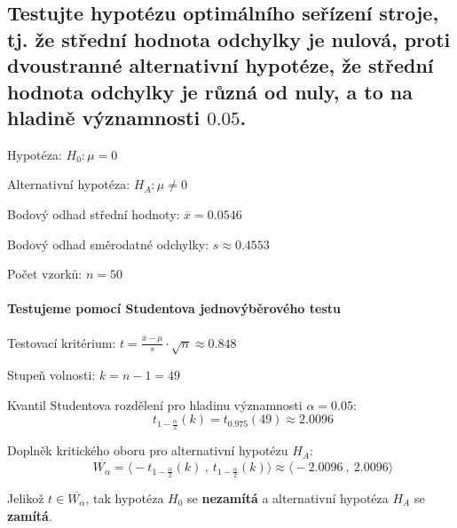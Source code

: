 
\subsection{Testujte hypotézu optimálního seřízení stroje, tj. že střední hodnota odchylky je nulová, proti dvoustranné alternativní hypotéze, že střední hodnota odchylky je různá od nuly, a to na hladině významnosti $0.05$.}

\begin{compactitem}
    \item Hypotéza: ${\displaystyle H_0 : \mu = 0}$

    \item Alternativní hypotéza: ${\displaystyle H_{A} : \mu \neq 0}$

    \item Bodový odhad střední hodnoty: ${\displaystyle \overline{x} = 0.0546}$

    \item Bodový odhad směrodatné odchylky: ${\displaystyle s \approx 0.4553}$

    \item Počet vzorků: ${\displaystyle n = 50}$
\end{compactitem}

\paragraph*{Testujeme pomocí Studentova jednovýběrového testu}

\begin{compactitem}
    \item Testovací kritérium: ${\displaystyle t = \frac{\overline{x} - \mu}{s} \cdot \sqrt{n} \approx 0.848}$

    \item Stupeň volnosti: ${\displaystyle k = n - 1 = 49}$

    \item Kvantil Studentova rozdělení pro hladinu významnosti ${\displaystyle \alpha = 0.05}$:
    $${\displaystyle \qquad t_{1 - \frac{\alpha}{2}}(k) = t_{0.975}(49) \approx 2.0096}$$

    \item Doplněk kritického oboru pro alternativní hypotézu ${\displaystyle H_{A}}$:
    $${\displaystyle \qquad \overline{W_\alpha} = \big\langle -t_{1 - \frac{\alpha}{2}}(k) ~,~ t_{1 - \frac{\alpha}{2}}(k) \big\rangle \approx \big\langle -2.0096 ~,~ 2.0096 \big\rangle}$$

    \item Jelikož ${\displaystyle t \in \overline{W_\alpha}}$, tak hypotéza ${\displaystyle H_0}$ se \textbf{nezamítá} a alternativní hypotéza ${\displaystyle H_A}$ se \textbf{zamítá}.
\end{compactitem}

